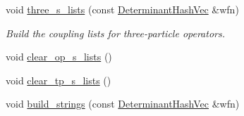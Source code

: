 \begin{DoxyCompactItemize}
void \mbox{\hyperlink{classforte_1_1_determinant_substitution_lists_ace6681417102c8cc027ea4287aa33b61}{three\+\_\+s\+\_\+lists}} (const \mbox{\hyperlink{classforte_1_1_determinant_hash_vec}{Determinant\+Hash\+Vec}} \&wfn)
\begin{DoxyCompactList}\small\item\em Build the coupling lists for three-\/particle operators. \end{DoxyCompactList}\item 
void \mbox{\hyperlink{classforte_1_1_determinant_substitution_lists_a7cafd675639529eccf9ccd59f9784579}{clear\+\_\+op\+\_\+s\+\_\+lists}} ()
\item 
void \mbox{\hyperlink{classforte_1_1_determinant_substitution_lists_aa2aa6b7311cb5ac250088c974acf4329}{clear\+\_\+tp\+\_\+s\+\_\+lists}} ()
\item 
void \mbox{\hyperlink{classforte_1_1_determinant_substitution_lists_a70a51832932974071ae62cd720632b42}{build\+\_\+strings}} (const \mbox{\hyperlink{classforte_1_1_determinant_hash_vec}{Determinant\+Hash\+Vec}} \&wfn)
\end{DoxyCompactItemize}
